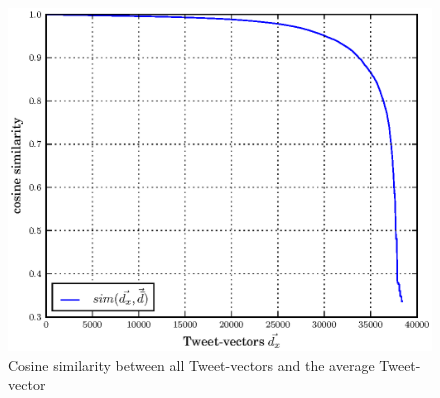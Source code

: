 \documentclass[../Main.tex]{subfiles}
\begin{document}
\begin{figure}
  \begin{center}
   \includegraphics[width=\columnwidth]{../img/cos-verteilung.eps}
    \caption{\label{cos_distribution} Cosine similarity between all Tweet-vectors and the average Tweet-vector}
  \end{center}
\end{figure}

\end{document}
